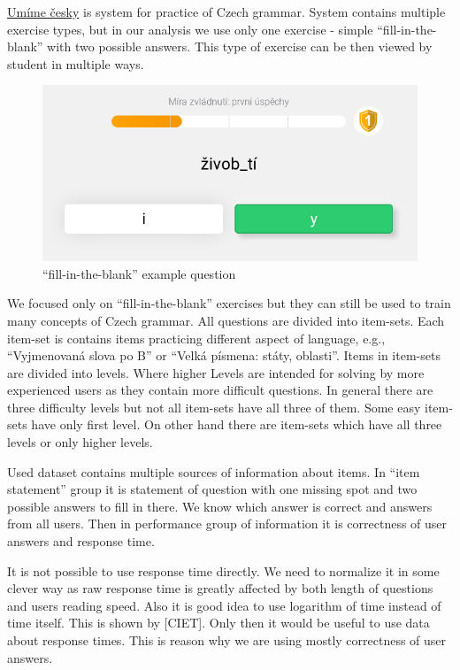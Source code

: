 \documentclass[
  digital, %
  table,   %
  nolof,     %
  nolot,     %
  nocover
]{fithesis3}
\begin{document}
\href{https://umimecesky.cz/}{Umíme česky} is system for practice of
Czech grammar. System contains multiple exercise types, but in our
analysis we use only one exercise - simple ``fill-in-the-blank'' with
two possible answers. This type of exercise can be then viewed by
student in multiple ways. %

\begin{figure}
\centering
\includegraphics{img/umimecesky_doplnovacka}
\caption{``fill-in-the-blank'' example question}
\end{figure}

We focused only on ``fill-in-the-blank'' exercises but they can still be
used to train many concepts of Czech grammar. All questions are divided into item-sets. Each item-set is contains items practicing different aspect of language, e.g., ``Vyjmenovaná slova po B'' or ``Velká písmena: státy, oblasti''. Items in item-sets are divided into levels. Where higher Levels are intended for solving by more experienced users as they contain more difficult questions. In general there are three difficulty levels but not all item-sets have all three of them. Some easy item-sets have only first level. On other hand there are item-sets which have all three levels or only higher levels.


Used dataset contains multiple sources of information about items. In ``item statement'' group it is statement of question with one missing spot and two possible answers to fill in there. We know which answer is correct and answers from all users. Then in performance group of information it is correctness of user answers and response time.

It is not possible to use response time directly. We need to normalize it in some clever way as raw response time is greatly affected by both length of questions and users reading speed. Also it is good idea to use logarithm of time instead of time itself. This is shown by [CIET]. Only then it would be useful to use data about response times. This is reason why we are using mostly correctness of user answers.
\end{document}
